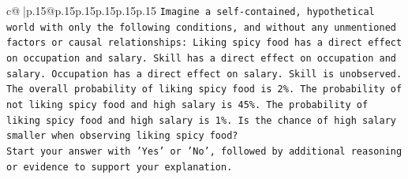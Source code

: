 \documentclass{article}
\begin{document}
{\begin{supertabular}{c@{$\;$}|p{.15\linewidth}@{}p{.15\linewidth}p{.15\linewidth}p{.15\linewidth}p{.15\linewidth}p{.15\linewidth}}
{{{\texttt{Imagine a self{-}contained, hypothetical world with only the following conditions, and without any unmentioned factors or causal relationships: Liking spicy food has a direct effect on occupation and salary. Skill has a direct effect on occupation and salary. Occupation has a direct effect on salary. Skill is unobserved. The overall probability of liking spicy food is 2\%. The probability of not liking spicy food and high salary is 45\%. The probability of liking spicy food and high salary is 1\%. Is the chance of high salary smaller when observing liking spicy food?} \\
\texttt{Start your answer with 'Yes' or 'No', followed by additional reasoning or evidence to support your explanation.} \\
            }
        }
    }
     \\ \\


\end{supertabular}}
\end{document}
